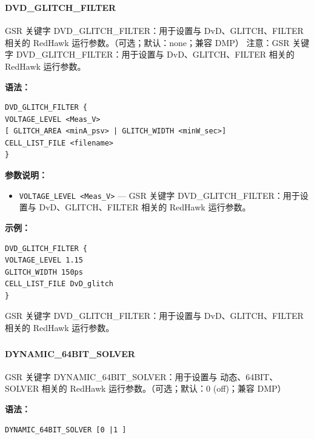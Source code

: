\subsubsection{}
\paragraph*{DVD_GLITCH_FILTER}

GSR 关键字 DVD_GLITCH_FILTER：用于设置与 DvD、GLITCH、FILTER 相关的 RedHawk 运行参数。（可选；默认：none；兼容 DMP） 注意：GSR 关键字 DVD_GLITCH_FILTER：用于设置与 DvD、GLITCH、FILTER 相关的 RedHawk 运行参数。

\textbf{语法：}
\begin{lstlisting}
DVD_GLITCH_FILTER {
VOLTAGE_LEVEL <Meas_V>
[ GLITCH_AREA <minA_psv> | GLITCH_WIDTH <minW_sec>]
CELL_LIST_FILE <filename>
}
\end{lstlisting}

\textbf{参数说明：}
\begin{itemize}
\item \texttt{VOLTAGE\_LEVEL <Meas\_V>} — GSR 关键字 DVD\_GLITCH\_FILTER：用于设置与 DvD、GLITCH、FILTER 相关的 RedHawk 运行参数。
\end{itemize}

\textbf{示例：}
\begin{lstlisting}
DVD_GLITCH_FILTER {
VOLTAGE_LEVEL 1.15
GLITCH_WIDTH 150ps
CELL_LIST_FILE DvD_glitch
}
\end{lstlisting}

\begin{noteBox}
GSR 关键字 DVD\_GLITCH\_FILTER：用于设置与 DvD、GLITCH、FILTER 相关的 RedHawk 运行参数。
\end{noteBox}

\subsubsection{}
\paragraph*{DYNAMIC_64BIT_SOLVER}

GSR 关键字 DYNAMIC_64BIT_SOLVER：用于设置与 动态、64BIT、SOLVER 相关的 RedHawk 运行参数。（可选；默认：0 (off)；兼容 DMP）

\textbf{语法：}
\begin{lstlisting}
DYNAMIC_64BIT_SOLVER [0 |1 ]
\end{lstlisting}

